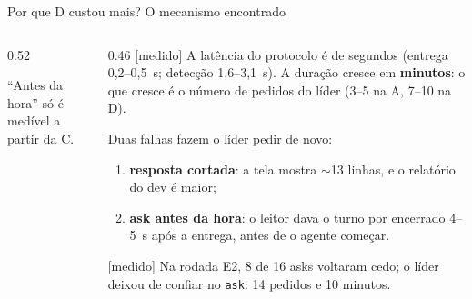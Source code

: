 \documentclass[11pt,aspectratio=169]{beamer}
\newcommand{\ev}[2]{{\scriptsize\sffamily\colorbox{#1!12}{\textcolor{#1!80!black}{[#2]}}}}
\newcommand{\medido}{\ev{ok}{medido}}
\begin{document}
\begin{frame}{Por que D custou mais? O mecanismo encontrado}
\begin{columns}[T]
\begin{column}{0.52\linewidth}
\centering
{}
{\tiny\color{suave} ``Antes da hora'' só é medível a partir da C.}
\end{column}
\begin{column}{0.46\linewidth}
\footnotesize
\medido{} A latência do protocolo é de segundos (entrega 0,2--0,5~s; detecção 1,6--3,1~s). A duração cresce em
\textbf{minutos}: o que cresce é o número de pedidos do líder (3--5 na A, 7--10 na D).
\vspace{0.5em}

Duas falhas fazem o líder pedir de novo:
\begin{enumerate}\setlength\itemsep{0.2em}
\item \textbf{resposta cortada}: a tela mostra $\sim$13 linhas, e o relatório do dev é maior;
\item \textbf{ask antes da hora}: o leitor dava o turno por encerrado 4--5~s após a entrega, antes de o agente começar.
\end{enumerate}
\medido{} Na rodada E2, 8 de 16 asks voltaram cedo; o líder deixou de confiar no \texttt{ask}: 14 pedidos e 10 minutos.
\end{column}
\end{columns}
\end{frame}
\end{document}
